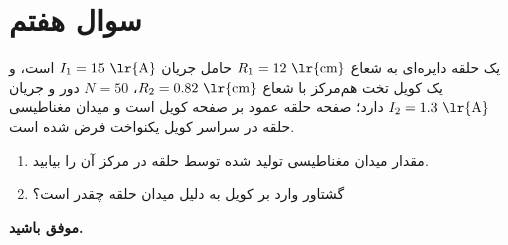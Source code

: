 \documentclass[a4paper,16pt]{article}
\begin{document}
	\section{سوال هفتم}
یک حلقه دایره‌ای به شعاع \(R_1 = 12~\text{\lr{cm}}\) حامل جریان \(I_1 = 15~\text{\lr{A}}\) است، و یک کویل تخت هم‌مرکز با شعاع \(R_2 = 0.82~\text{\lr{cm}}\)، \(N = 50\) دور و جریان \(I_2 = 1.3~\text{\lr{A}}\) دارد؛ صفحه حلقه عمود بر صفحه کویل است و میدان مغناطیسی حلقه در سراسر کویل یکنواخت فرض شده است.  


\begin{enumerate}
	\item[(الف)] مقدار میدان مغناطیسی تولید شده توسط حلقه در مرکز آن را بیابید.
	\item[(ب)] گشتاور وارد بر کویل به دلیل میدان حلقه چقدر است؟
\end{enumerate}

	\textbf{موفق باشید.}
\end{document}
